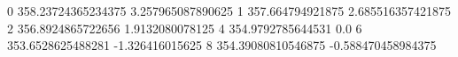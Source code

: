 0 358.23724365234375 3.257965087890625
1 357.664794921875 2.685516357421875
2 356.8924865722656 1.9132080078125
4 354.9792785644531 0.0
6 353.6528625488281 -1.326416015625
8 354.39080810546875 -0.588470458984375
